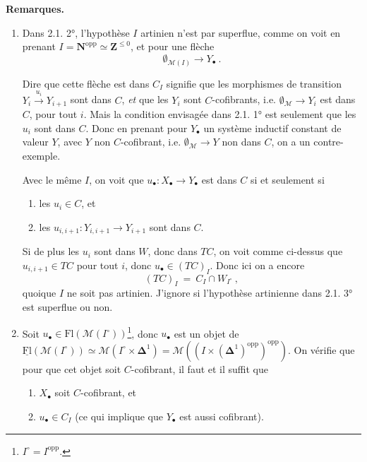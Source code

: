 \documentclass[11pt]{article}
\newcommand{\printedpage}[1]{\marginpar{\footnotesize p.~#1\ifstrequal{#1}{1}{\\[2pt]{[page 1]}}{}}}
\newcommand{\msp}[1]{\ifstrequal{#1}{page 1}{}{\marginpar{\footnotesize [#1]}}}
\newcommand{\M}{\mathcal{M}}
\begin{document}
\noindent\textbf{Remarques.}
\begin{enumerate}[leftmargin=2.5em]
\item[1)] Dans 2.1. 2°, l'hypothèse $I$ artinien n'est par superflue, comme on voit en prenant $I = \mathbf{N}^{\mathrm{opp}} \simeq \mathbf{Z}^{\leq 0}$, \msp{38} et pour une flèche %
\[ \emptyset_{\M(I)} \longrightarrow Y_\bullet\ . \]

Dire que cette flèche est dans $C_I$ signifie que les morphismes de transition $Y_i \xrightarrow{u_i} Y_{i+1}$ sont dans $C$, \textit{et} que les $Y_i$ sont $C$-cofibrants, i.e. $\emptyset_{\M} \longrightarrow Y_i$ est dans $C$, pour tout $i$. Mais la condition envisagée dans 2.1. 1° est seulement que les $u_i$ sont dans $C$. Donc en prenant pour $Y_\bullet$ un système inductif constant de valeur $Y$, avec $Y$ non $C$-cofibrant, i.e. $\emptyset_{\M} \longrightarrow Y$ non dans $C$, on a un contre-exemple.

Avec le même $I$, on voit que $u_\bullet : X_\bullet \longrightarrow Y_\bullet$ est dans $C$ si et seulement si
\begin{enumerate}[leftmargin=2.5em]
\item[a)] les $u_i \in C$, et
\item[b)] les $u_{i,i+1} : Y_{i,i+1} \longrightarrow Y_{i+1}$ sont dans $C$.
\end{enumerate}

\printedpage{21}

Si de plus les $u_i$ sont dans $W$, donc dans $TC$, on voit comme ci-dessus que $u_{i,i+1} \in TC$ pour tout $i$, donc $u_\bullet \in (TC)_I$. Donc ici on a encore
\[ (TC)_I \ = \ C_I \cap W_{I^\circ}\ , \]
quoique $I$ ne soit pas artinien. J'ignore si l'hypothèse artinienne dans 2.1. 3° est superflue ou non.
\item[2)] Soit $u_\bullet \in \mathrm{Fl}(\M(I^\circ))$\footnote[13]{$I^\circ = I^{\mathrm{opp}}$.}, donc $u_\bullet$ est un objet de $\underline{\mathrm{Fl}}(\M(I^\circ)) \simeq \M(I^\circ \times \boldsymbol{\Delta}^1) = \M((I \times (\boldsymbol{\Delta}^1)^{\mathrm{opp}})^{\mathrm{opp}})$. On vérifie que pour que cet objet soit $C$-cofibrant, il faut et il suffit que
\begin{enumerate}[leftmargin=2.5em]
\item[1°)] $X_\bullet$ soit $C$-cofibrant, et
\item[2°)] $u_\bullet \in C_I$ (ce qui implique que $Y_\bullet$ est aussi cofibrant).
\end{enumerate}
\end{enumerate}
\msp{39}
\end{document}

